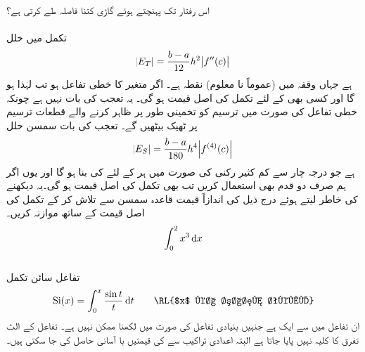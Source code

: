 اس رفتار تک پہنچتے ہوئے گاڑی کتنا فاصلہ طے کرتی ہے؟
\\
\\
تکمل  میں خلل
\begin{align*}
\abs{E_T}=\frac{b-a}{12}h^2\abs{f''(c)}
\end{align*}
ہے جہاں  وقفہ  میں  (عموماً نا معلوم) نقطہ ہے۔ اگر  متغیر  کا خطی تفاعل ہو تب   لہٰذا  ہو گا اور کسی بھی  کے لئے تکمل کی اصل قیمت  ہو گی۔ یہ تعجب کی بات نہیں ہے چونکہ خطی تفاعل کی صورت میں ترسیم کو تخمینی طور پر ظاہر کرنے والے قطعات ترسیم پر ٹھیک بیٹھیں گے۔  تعجب کی بات سمسن خلل
\begin{align*}
\abs{E_S}=\frac{b-a}{180}h^4\abs{f^{(4)}(c)}
\end{align*} 
ہے جو درجہ چار سے کم کثیر رکنی    کی صورت میں ہر  کے لئے   کی بنا  ہو گا اور یوں اگر ہم صرف دو قدم بھی استعمال کریں تب بھی  تکمل کی اصل قیمت ہو گی۔یہ دیکھنے کی خاطر  لیتے ہوئے درج ذیل کی اندازاً قیمت قاعدہ سمسن سے  تلاش کر کے تکمل کی اصل قیمت کے ساتھ موازنہ کریں۔
\begin{align*}
\int_0^2x^3\dif x
\end{align*}
\\
تفاعل سائن تکمل
\begin{align*}
\kSi(x)=\int_0^x\frac{\sin t}{t}\dif t\quad\quad\text{\RL{$x$ کا سائن تکمل}}
\end{align*}
ان تفاعل میں سے ایک ہے جنہیں بنیادی تفاعل کی صورت میں لکھنا ممکن نہیں ہے۔ تفاعل  کے الٹ تفرق کا کلیہ نہیں پایا جاتا ہے البتہ اعدادی تراکیب سے  کی قیمتیں با آسانی حاصل کی جا سکتی ہیں۔ 

